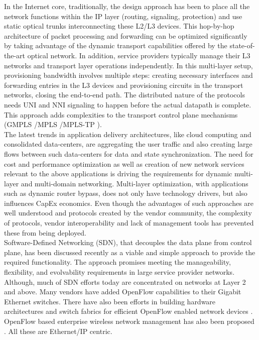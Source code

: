 \documentclass{sig-alternate-10pt}
\begin{document}
	In the Internet core, traditionally, the design approach has been to place all the network functions within the IP layer
	(routing, signaling, protection) and use static optical trunks interconnecting these L2/L3 devices. This hop-by-hop architecture of packet processing
	and forwarding can be optimized significantly by taking advantage of the dynamic transport capabilities offered by the state-of-the-art optical network. 
	In addition, service providers 
	typically manage their L3 networks and transport layer operations independently. In this multi-layer setup, provisioning bandwidth involves multiple
	steps: creating necessary interfaces and forwarding entries in the L3 devices and provisioning circuits
	in the transport networks, closing the end-to-end path. The distributed nature of the protocols 
	needs UNI and NNI signaling to happen before the actual datapath is complete. This approach adds
	complexities to the transport control plane mechanisms (GMPLS \cite{gmpls}/MPLS \cite{mpls}/MPLS-TP
	\cite{mpls-tp}). \\
	
	The latest trends in application delivery architectures, like cloud computing and consolidated data-centers, are aggregating the user traffic 
	and also creating large flows between such data-centers for data and state synchronization. The need for cost and performance optimization as well as creation
	of new network services relevant to the above applications is  driving the requirements for dynamic multi-layer and multi-domain networking. Multi-layer optimization,
	with applications such as dynamic router bypass, does not only have technology drivers, but also influences CapEx economics. Even though
	the advantages of such approaches are well understood and protocols created by the vendor community, the complexity of protocols, vendor interoperability 
	and lack of management tools has prevented these from being deployed.\\
	
	Software-Defined Networking (SDN), that decouples the data plane from control plane, has been discussed recently \cite{Das2012} 
	as a viable and simple approach to provide the required functionality. The approach promises meeting the manageability, flexibility, and evolvability 
	requirements in large service provider networks. Although, much of SDN efforts today are concentrated on networks at Layer 2 and above. Many vendors have
	added OpenFlow capabilities to their Gigabit Ethernet switches. There have also been efforts in building
	hardware architectures \cite{Mogul2012} and switch fabrics for efficient OpenFlow enabled network devices
	\cite{Casado2012}. OpenFlow based enterprise wireless network management has also been proposed \cite{Suresh2012}. All these are Ethernet/IP centric.\\
	
\end{document}
